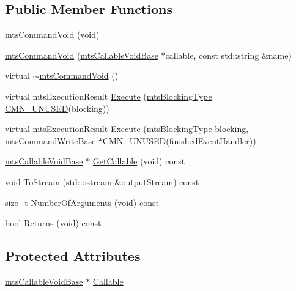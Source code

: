 \subsection*{Public Member Functions}
\begin{DoxyCompactItemize}
\item 
\hyperlink{classmts_command_void_add7891a491c181e37917f7a211d193c7}{mts\+Command\+Void} (void)
\item 
\hyperlink{classmts_command_void_a2f7b89cb275bf29655cc2ab534ccae99}{mts\+Command\+Void} (\hyperlink{classmts_callable_void_base}{mts\+Callable\+Void\+Base} $\ast$callable, const std\+::string \&name)
\item 
virtual \hyperlink{classmts_command_void_a99f6dff6f507e583a24764851e8c481a}{$\sim$mts\+Command\+Void} ()
\item 
virtual mts\+Execution\+Result \hyperlink{classmts_command_void_a931ef188b21159c6340021fdd7a2d373}{Execute} (\hyperlink{mts_forward_declarations_8h_ad7426ccb6c883bc780d0ee197dddcbe7}{mts\+Blocking\+Type} \hyperlink{cmn_portability_8h_a021894e2626935fa2305434b1e893ff6}{C\+M\+N\+\_\+\+U\+N\+U\+S\+E\+D}(blocking))
\item 
virtual mts\+Execution\+Result \hyperlink{classmts_command_void_a723eaff3810f72fe6490f36ed403e04c}{Execute} (\hyperlink{mts_forward_declarations_8h_ad7426ccb6c883bc780d0ee197dddcbe7}{mts\+Blocking\+Type} blocking, \hyperlink{classmts_command_write_base}{mts\+Command\+Write\+Base} $\ast$\hyperlink{cmn_portability_8h_a021894e2626935fa2305434b1e893ff6}{C\+M\+N\+\_\+\+U\+N\+U\+S\+E\+D}(finished\+Event\+Handler))
\item 
\hyperlink{classmts_callable_void_base}{mts\+Callable\+Void\+Base} $\ast$ \hyperlink{classmts_command_void_ad6297c6f39e9fa1fa4599bf24585d562}{Get\+Callable} (void) const 
\item 
void \hyperlink{classmts_command_void_a3b78ce1750d144b2e914be8e03274539}{To\+Stream} (std\+::ostream \&output\+Stream) const 
\item 
size\+\_\+t \hyperlink{classmts_command_void_a23ee972966793e40665977cf8f41c6be}{Number\+Of\+Arguments} (void) const 
\item 
bool \hyperlink{classmts_command_void_aeb8434a7a2da25fc331ae4bbff3ca859}{Returns} (void) const 
\end{DoxyCompactItemize}
\subsection*{Protected Attributes}
\begin{DoxyCompactItemize}
\item 
\hyperlink{classmts_callable_void_base}{mts\+Callable\+Void\+Base} $\ast$ \hyperlink{classmts_command_void_aece6de22d32c402ea6f4baf428d56a05}{Callable}
\end{DoxyCompactItemize}


